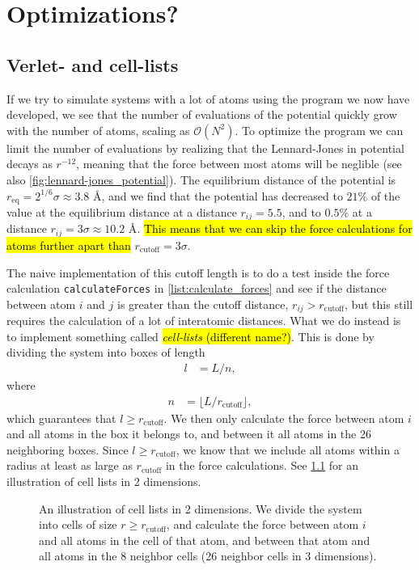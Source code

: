 \chapter{Optimizations?}

\section{Verlet- and cell-lists\label{sec:cell_lists}}
If we try to simulate systems with a lot of atoms using the program we now have developed, we see that the number of evaluations of the potential quickly grow with the number of atoms, scaling as $\mathcal{O}(N^2)$. To optimize the program we can limit the number of evaluations by realizing that the Lennard-Jones in potential decays as $r^{-12}$, meaning that the force between most atoms will be neglible (see also \cref{fig:lennard-jones_potential}). The equilibrium distance of the potential is $r_{\text{eq}} =  2^{1/6}\sigma \approx 3.8 \text{~\AA}$, and we find that the potential has decreased to $21\%$ of the value at the equilibrium distance at a distance $r_{ij} =  5.5$, and to $0.5\%$ at a distance $r_{ij} =  3\sigma \approx 10.2\text{~\AA}$. \hl{This means that we can skip the force calculations for atoms further apart than} $r_{\text{cutoff}} = 3\sigma$.

The naive implementation of this cutoff length is to do a test inside the force calculation \texttt{calculateForces} in \cref{list:calculate_forces} and see if the distance between atom $i$ and $j$ is greater than the cutoff distance, $r_{ij} > r_\text{cutoff}$, but this still requires the calculation of a lot of interatomic distances. What we do instead is to implement something called \hl{\emph{cell-lists} (different name?)}. This is done by dividing the system into boxes of length 
\begin{align*}
    l &= L/n,
\end{align*}
where
\begin{align*}
    n &= \lfloor  L/r_\text{cutoff} \rfloor,
\end{align*}
which guarantees that $l \geq r_\text{cutoff}$. We then only calculate the force between atom $i$ and all atoms in the box it belongs to, and between it all atoms in the 26 neighboring boxes. Since $l\geq r_\text{cutoff}$, we know that we include all atoms within a radius at least as large as $r_\text{cutoff}$ in the force calculations. See \cref{fig:cell_lists} for an illustration of cell lists in 2 dimensions.
\begin{figure}[htpb]%
    \centering%
    \caption{%
        An illustration of cell lists in 2 dimensions. We divide the system into cells of size $r \geq r_\text{cutoff}$, and calculate the force between atom $i$ and all atoms in the cell of that atom, and between that atom and all atoms in the 8 neighbor cells (26 neighbor cells in 3 dimensions). %
        \label{fig:cell_lists}%
    }%
\end{figure}%

